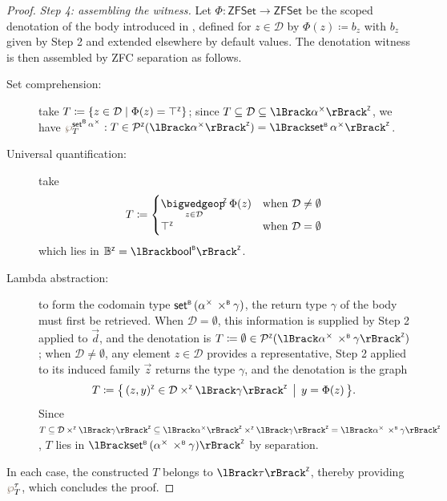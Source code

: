\begin{proof}
  \smallskip\noindent\emph{Step 4: assembling the witness.}
  Let \(\Phi : \mathsf{ZFSet} \to \mathsf{ZFSet}\) be the scoped denotation of the
  body introduced in , defined for \(z \in \mathcal{D}\) by
  \(\Phi(z) \coloneq b_z\) with \(b_z\) given by Step 2 and extended elsewhere by
  default values. The denotation witness is then assembled by ZFC separation as follows.
  \begin{description}
    \item[Set comprehension:] take
          \(T \coloneq \{ z \in \mathcal{D} \mid \Phi(z) = \top^{\scriptscriptstyle{\mathsf{Z}}} \}\); since
          \(T \subseteq \mathcal{D} \subseteq \interpZ{\alpha^\times}\), we have
          \(\pf{\setB\alpha^\times}{T} : T \in \powZ(\interpZ{\alpha^\times}) = \interpZ{\setB\alpha^\times}\).
    \item[Universal quantification:] take
          \[
            T \coloneq
            \begin{cases}
              \displaystyle \bigandZ_{z \in \mathcal{D}} \Phi(z) & \text{when } \mathcal{D} \neq \emptyset \\
              \topZ                                              & \text{when } \mathcal{D} = \emptyset
            \end{cases}
          \]
          which lies in \(\Zbool = \interpZ{\boolB}\).
    \item[Lambda abstraction:] to form the codomain type
          \(\mathsf{set}^{\scriptscriptstyle{\mathsf{B}}}\,(\alpha^\times \mathbin{\,\times^{\scriptscriptstyle{\mathsf{B}}}} \gamma)\), the return type \(\gamma\) of the body
          must first be retrieved. When \(\mathcal{D} = \emptyset\), this information is
          supplied by Step 2 applied to \(\vec d\), and the denotation is
          \(T \coloneq \emptyset \in \powZ(\interpZ{\alpha^\times \prodB \gamma})\); when
          \(\mathcal{D} \neq \emptyset\), any element \(z \in \mathcal{D}\) provides a
          representative, Step 2 applied to its induced family \(\vec z\) returns
          the type \(\gamma\), and the denotation is the graph
          \[
            T \coloneq \bigl\{\, \pairZ{z}{y} \in \mathcal{D} \timesZ \interpZ{\gamma}
            \,\bigm|\, y = \Phi(z) \,\bigr\}.
          \]
          Since \(T \subseteq \mathcal{D} \timesZ \interpZ{\gamma}
          \subseteq \interpZ{\alpha^\times} \timesZ \interpZ{\gamma}
          = \interpZ{\alpha^\times \prodB \gamma}\), \(T\) lies in
          \(\interpZ{\setB(\alpha^\times \prodB \gamma)}\) by separation.
  \end{description}

  In each case, the constructed \(T\) belongs to \(\interpZ{\tau}\), thereby providing
  \(\pf{\tau}{T}\), which concludes the proof.
\end{proof}

